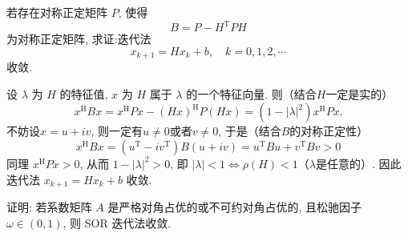 \documentclass[12pt, answers]{exam}     %
\newcommand{\T}{\mathrm{T}}
\newcommand{\HH}{\mathrm{H}}
\begin{document}
\begin{questions}
\question{}若存在对称正定矩阵 \( P \), 使得
\[
B = P - H^{\T} P H
\]
为对称正定矩阵, 求证:迭代法
\[
x_{k+1} = H x_k + b, \quad k = 0, 1, 2, \cdots
\]
收敛. 

\begin{solution}
设 \(\lambda\) 为 \(H\) 的特征值, \(x\) 为 \(H\) 属于 \(\lambda\) 的一个特征向量. 则（结合$H$一定是实的）
\[
x^{\HH} B x = x^{\HH} P x - (H x)^{\HH} P (H x) = (1 - |\lambda|^{2}) x^{\HH} P x. 
\]
不妨设$x = u + iv$, 则一定有$u \neq 0$或者$v \neq 0$, 于是（结合$B$的对称正定性）
\[
x^{\HH} B x = (u^{\T} - iv^{\T})B(u + iv) = u^{\T} B u + v^{\T} B v > 0
\]
同理 \(x^{\HH} P x > 0\), 从而 \(1 - |\lambda|^{2} > 0\), 
即 \( |\lambda| < 1 \Leftrightarrow \rho(H) < 1\)（$\lambda$是任意的）. 
因此迭代法 \(x_{k+1} = H x_k + b\) 收敛. 
\end{solution}


\question{}证明: 若系数矩阵 \( A \) 是严格对角占优的或不可约对角占优的, 
且松驰因子 \( \omega \in (0, 1) \), 则 SOR 迭代法收敛. 


\end{questions}
\end{document}

